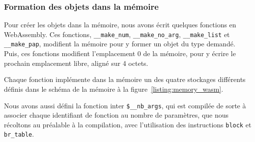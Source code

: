 \documentclass{rapportECL}
\begin{document}
\subsubsection{Formation des objets dans la mémoire}

Pour créer les objets dans la mémoire, nous avons écrit quelques fonctions en WebAssembly.
Ces fonctions, \verb|__make_num|, \verb|__make_no_arg|, \verb|__make_list| et \verb|__make_pap|, modifient la mémoire
pour y former un objet du type demandé. Puis, ces fonctions modifient l'emplacement 0 de la mémoire, pour y écrire le
prochain emplacement libre, aligné sur 4 octets. 

Chaque fonction implémente dans la mémoire un des quatre stockages différents définis dans le schéma de la 
mémoire à la figure~\ref{listing:memory_wasm}.

\medskip







\medskip
Nous avons aussi défini la fonction inter \verb|$__nb_args|, qui est compilée de sorte à associer chaque identifiant de fonction au nombre de paramètres, que nous récoltons au préalable à la compilation, avec l'utilisation des instructions \verb|block| et \verb|br_table|.
\end{document}
